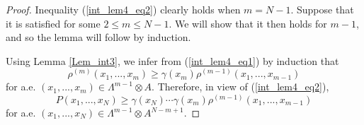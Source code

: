 \documentclass[12pt,leqno]{amsart}
\numberwithin{equation}{section}
\numberwithin{theor}{section}
\numberwithin{rem}{section}
\begin{document}
\begin{proof}
Inequality (\ref{int_lem4_eq2}) clearly holds when $m=N-1$.  
Suppose that it is satisfied for some $2\leq m \leq N-1$.  We 
will show that it then holds for $m-1$, and so the lemma will 
follow by induction.  

Using Lemma \ref{Lem_int3}, we infer from (\ref{int_lem4_eq1}) by induction that 
\begin{equation}
\label{int_lem4_eq3}
\rho^{(m)}(x_1,...,x_{m}) \geq \gamma(x_m) 
\rho^{(m-1)}(x_1,...,x_{m-1})
\end{equation}
for a.e. $(x_1,...,x_{m})\in \Lambda^{m-1}\otimes A$.  
Therefore, in view of (\ref{int_lem4_eq2}), 
\begin{equation}
\label{int_lem4_eq4}
P(x_1,...,x_{N})\geq \gamma(x_{N})\cdots\gamma(x_{m}) 
\rho^{(m-1)}(x_1,...,x_{m-1}) 
\end{equation}
for a.e. 
$(x_1,...,x_{N})\in \Lambda^{m-1}\otimes A^{N-m+1}$. 
\end{proof}
\end{document}
